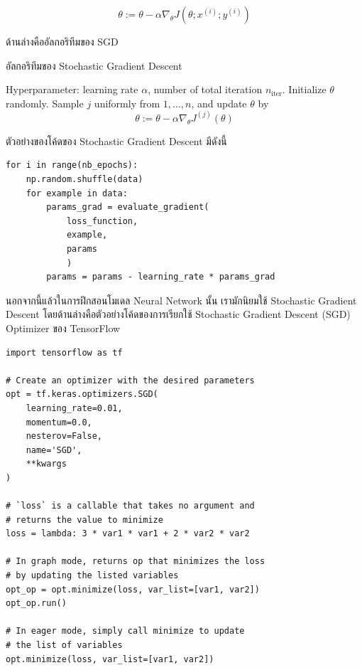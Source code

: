 \begin{equation}\label{eq:sgd}
    \theta := \theta - \alpha\nabla_\theta J( \theta; x^{(i)}; y^{(i)})
\end{equation}

\noindent ด้านล่างคืออัลกอริทึมของ SGD

\begin{algorithm}[H]
    \caption{อัลกอริทึมของ Stochastic Gradient Descent}
    \label{alg:sgd}
    \begin{algorithmic}
        \State Hyperparameter: learning rate $\alpha$, number of total iteration $n_\text{iter}$.
        \State Initialize $\theta$ randomly.
        \State Sample $j$ uniformly from ${1,\ldots,n}$, and update $\theta$ by
        \begin{equation*}
            \theta := \theta - \alpha\nabla_\theta J^{(j)}(\theta)
        \end{equation*}
        \EndFor
    \end{algorithmic}
\end{algorithm}

\noindent ตัวอย่างของโค้ดของ Stochastic Gradient Descent มีดังนี้

\begin{lstlisting}[style=MyPython]
for i in range(nb_epochs):
    np.random.shuffle(data)
    for example in data:
        params_grad = evaluate_gradient(
            loss_function, 
            example, 
            params
            )
        params = params - learning_rate * params_grad
\end{lstlisting}

\vspace{1em}
\noindent นอกจากนี้แล้วในการฝึกสอนโมเดล Neural Network นั้น เรามักนิยมใช้ Stochastic Gradient Descent โดยด้านล่างคือตัวอย่างโค้ดของการเรียกใช้ Stochastic Gradient Descent (SGD) Optimizer ของ TensorFlow

\begin{lstlisting}[style=MyPython]
import tensorflow as tf

# Create an optimizer with the desired parameters
opt = tf.keras.optimizers.SGD(
    learning_rate=0.01,
    momentum=0.0,
    nesterov=False,
    name='SGD',
    **kwargs
)

# `loss` is a callable that takes no argument and 
# returns the value to minimize
loss = lambda: 3 * var1 * var1 + 2 * var2 * var2

# In graph mode, returns op that minimizes the loss 
# by updating the listed variables
opt_op = opt.minimize(loss, var_list=[var1, var2])
opt_op.run()

# In eager mode, simply call minimize to update 
# the list of variables
opt.minimize(loss, var_list=[var1, var2])
\end{lstlisting}

